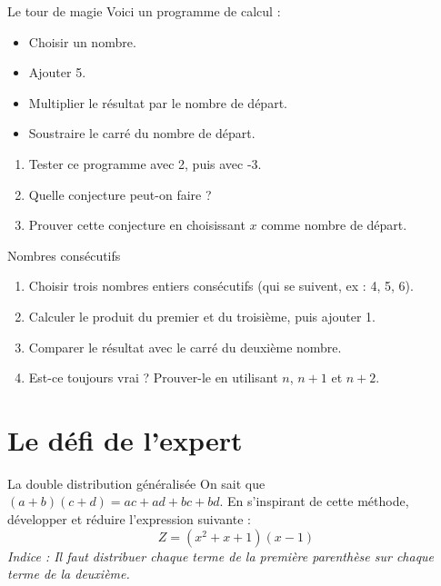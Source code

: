 \documentclass[a4paper]{book}
\begin{document}
    \begin{exerciceTitre}{Le tour de magie}
        Voici un programme de calcul :
        \begin{itemize}[label=\textbullet]
            \item Choisir un nombre.
            \item Ajouter 5.
            \item Multiplier le résultat par le nombre de départ.
            \item Soustraire le carré du nombre de départ.
        \end{itemize}
        \begin{enumerate}
            \item Tester ce programme avec 2, puis avec -3.
            \item Quelle conjecture peut-on faire ?
            \item Prouver cette conjecture en choisissant $x$ comme nombre de départ.
        \end{enumerate}
    \end{exerciceTitre}
    
    \begin{exerciceTitre}{Nombres consécutifs}
        \begin{enumerate}
            \item Choisir trois nombres entiers consécutifs (qui se suivent, ex : 4, 5, 6).
            \item Calculer le produit du premier et du troisième, puis ajouter 1.
            \item Comparer le résultat avec le carré du deuxième nombre.
            \item Est-ce toujours vrai ? Prouver-le en utilisant $n$, $n+1$ et $n+2$.
        \end{enumerate}
    \end{exerciceTitre}
    
    \section{Le défi de l'expert}
    
    \begin{exerciceTitre}{La double distribution généralisée}
        On sait que $(a+b)(c+d) = ac + ad + bc + bd$.
        En s'inspirant de cette méthode, développer et réduire l'expression suivante :
        \[ Z = (x^2 + x + 1)(x - 1) \]
        \textit{Indice : Il faut distribuer chaque terme de la première parenthèse sur chaque terme de la deuxième.}
    \end{exerciceTitre}
\end{document}
